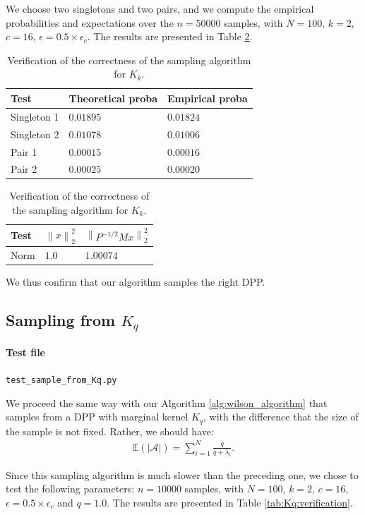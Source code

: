 \documentclass{article}
\newcommand{\abs} [1] {\left| #1 \right|}
\newcommand{\norm}[1]{\left\|#1\right\|}
\begin{document}
We choose two singletons and two pairs, and we compute the empirical probabilities and expectations over the $n=50000$ samples, with $N=100$, $k=2$, $c=16$, $\epsilon = 0.5 \times \epsilon_c$. The results are presented in Table \ref{tab:Kk:verification}.


\begin{table}[th]
  \caption{Verification of the correctness of the sampling algorithm for $K_k$.}
  \label{tab:Kk:verification}
  \centering
  \begin{tabular}{lll}
    \toprule
    Test &  Theoretical proba & Empirical proba \\
    \midrule
    Singleton 1 & $0.01895$ & $0.01824$ \\
    Singleton 2 & $0.01078$ & $0.01006$ \\
    Pair 1 & $0.00015$ & $0.00016$ \\
		Pair 2 & $0.00025$ & $0.00020$ \\
    \bottomrule
  \end{tabular}
	\quad
	\begin{tabular}{lll}
    \toprule
    Test &  $\norm{x}_2^2$ & $\norm{P^{-1/2} M x}_2^2$ \\
    \midrule
    Norm & $1.0$ & $1.00074$ \\
    \bottomrule
  \end{tabular}
\end{table}


We thus confirm that our algorithm samples the right DPP.


\subsection[Sampling from Kq]{Sampling from $K_q$}


\paragraph{Test file} \verb#test_sample_from_Kq.py#


We proceed the same way with our Algorithm \ref{alg:wilson_algorithm} that samples from a DPP with marginal kernel $K_q$, with the difference that the size of the sample is not fixed. Rather, we should have:
\begin{align} \mathbb{E}\left( \abs{\mathcal{A}}\right) = \sum_{i=1}^{N} \frac{q}{q+\lambda_i}. \end{align}


Since this sampling algorithm is much slower than the preceding one, we chose to test the following parameters: $n=10000$ samples, with $N=100$, $k=2$, $c=16$, $\epsilon = 0.5 \times \epsilon_c$ and $q=1.0$. The results are presented in Table \ref{tab:Kq:verification}.
\end{document}
